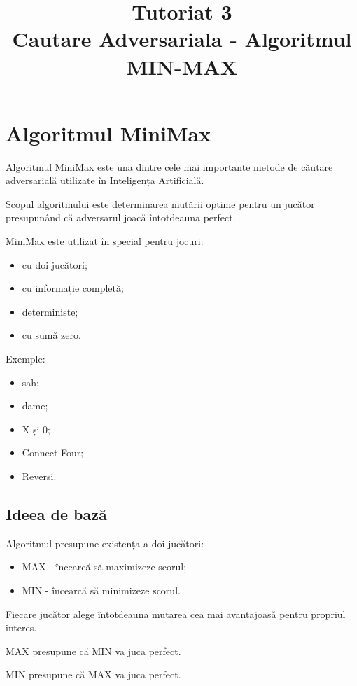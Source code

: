 \documentclass[12pt,a4paper]{article}
\title{Tutoriat 3\\Cautare Adversariala - Algoritmul MIN-MAX}
\author{}
\date{}
\begin{document}
\maketitle


\section{Algoritmul MiniMax}

Algoritmul MiniMax este una dintre cele mai importante metode de căutare adversarială utilizate în Inteligența Artificială.

Scopul algoritmului este determinarea mutării optime pentru un jucător presupunând că adversarul joacă întotdeauna perfect.

MiniMax este utilizat în special pentru jocuri:

\begin{itemize}
\item cu doi jucători;
\item cu informație completă;
\item deterministe;
\item cu sumă zero.
\end{itemize}

Exemple:

\begin{itemize}
\item șah;
\item dame;
\item X și 0;
\item Connect Four;
\item Reversi.
\end{itemize}

\subsection{Ideea de bază}

Algoritmul presupune existența a doi jucători:

\begin{itemize}
\item MAX - încearcă să maximizeze scorul;
\item MIN - încearcă să minimizeze scorul.
\end{itemize}

Fiecare jucător alege întotdeauna mutarea cea mai avantajoasă pentru propriul interes.

MAX presupune că MIN va juca perfect.

MIN presupune că MAX va juca perfect.
\end{document}
